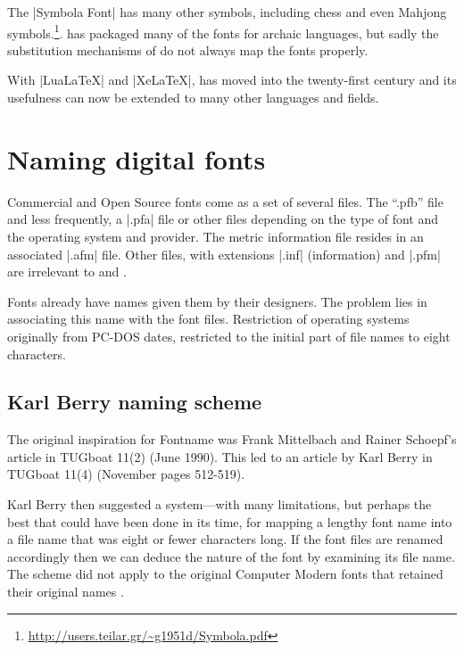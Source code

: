 %

The |Symbola Font| has many other symbols, including chess and even Mahjong symbols.\footnote{\url{http://users.teilar.gr/~g1951d/Symbola.pdf}}.  has packaged many of the fonts for archaic languages, but sadly the substitution mechanisms of \latexe do not always map the fonts properly.

With |LuaLaTeX| and |XeLaTeX|, \tex has moved into the twenty-first century and its usefulness can now be extended to many other languages and fields. 


\section{Naming digital fonts}

Commercial and Open Source fonts come as a set of several files. The \enquote{.pfb} file and less frequently, a |.pfa| file or other files depending on the type of font and the operating system and provider. The metric information file resides in an associated |.afm| file. Other files, with extensions |.inf| (information) and |.pfm| are irrelevant to \latex and \tex.

Fonts already have names given them by their designers. The problem lies in associating this name with the font files. Restriction of operating systems originally from PC-DOS dates, restricted to the initial part of file names to eight characters.

\subsection{Karl Berry naming scheme}

The original inspiration for Fontname was Frank Mittelbach and Rainer Schoepf's article in TUGboat 11(2) (June 1990). This led to an article by Karl Berry in TUGboat 11(4) (November pages 512-519).

Karl Berry then suggested a system---with many limitations, but perhaps the best that could have been done in its time, for mapping a lengthy font name into a file name that was eight or fewer characters long. If the font files are renamed accordingly then we can deduce the nature of the font by examining its file name. The scheme did not apply to the original Computer Modern fonts that retained their original names \citep{fontname}.

